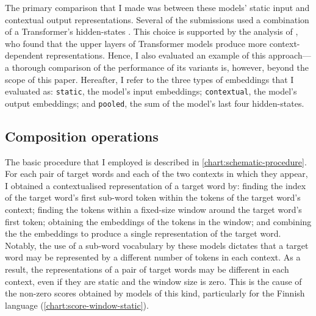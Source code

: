 The primary comparison that I made was between these models' static input and
contextual output representations.
Several of the submissions used a combination of a Transformer's hidden-states
\parencites[e.g.,][276]{Gamallo2020}[3]{Pessutto2020}[4]{Hettiarachchi2021}.
This choice is supported by the analysis of \textcite{Ethayarajh2019}, who found that
the upper layers of Transformer models produce more context-dependent representations.
Hence, I also evaluated an example of this approach—a thorough comparison of the
performance of its variants is, however, beyond the scope of this paper.
Hereafter, I refer to the three types of embeddings that I evaluated as:
\texttt{static}, the model's input embeddings; \texttt{contextual}, the model's output
embeddings; and \texttt{pooled}, the sum of the model's last four hidden-states.

\subsection{Composition operations}

The basic procedure that I employed is described in \cref{chart:schematic-procedure}.
For each pair of target words and each of the two contexts in which they appear, I
obtained a contextualised representation of a target word by: finding the index of the
target word's first sub-word token within the tokens of the target word's context;
finding the tokens within a fixed-size window around the target word's first token;
obtaining the embeddings of the tokens in the window; and combining the the embeddings
to produce a single representation of the target word.
Notably, the use of a sub-word vocabulary by these models
\parencite[e.g.,][4174]{Devlin2019} dictates that a target word may be represented by a
different number of tokens in each context.
As a result, the representations of a pair of target words may be different in each
context, even if they are static and the window size is zero.
This is the cause of the non-zero scores obtained by models of this kind, particularly
for the Finnish language (\cref{chart:score-window-static}).

